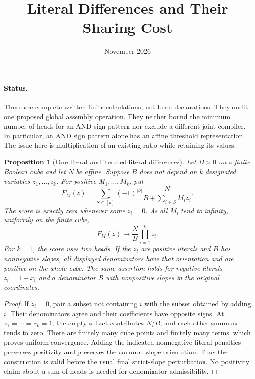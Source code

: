 \documentclass[11pt]{article}
\title{Literal Differences and Their Sharing Cost}
\author{}
\date{November 2026}
\newtheorem{proposition}{Proposition}
\begin{document}
\maketitle

\paragraph{Status.}
These are complete written finite calculations, not Lean declarations.
They audit one proposed global assembly operation. They neither bound
the minimum number of heads for an AND sign pattern nor exclude a
different joint compiler. In particular, an AND sign pattern alone has
an affine threshold representation. The issue here is multiplication
of an existing ratio while retaining its values.

\begin{proposition}[One literal and iterated literal differences]
Let $B>0$ on a finite Boolean cube and let $N$ be affine. Suppose $B$
does not depend on $k$ designated variables $z_1,\ldots,z_k$. For
positive $M_1,\ldots,M_k$, put
\[
 F_M(z)=\sum_{S\subseteq[k]}(-1)^{|S|}
       \frac{N}{B+\sum_{i\in S}M_i z_i}.
 \tag{1}
\]
The score is exactly zero whenever some $z_i=0$. As all $M_i$ tend to
infinity, uniformly on the finite cube,
\[
 F_M(z)\longrightarrow
 \frac{N}{B}\prod_{i=1}^k z_i.
 \tag{2}
\]
For $k=1$, the score uses two heads. If the $z_i$ are positive literals
and $B$ has nonnegative slopes, all displayed denominators have that
orientation and are positive on the whole cube. The same assertion
holds for negative literals $z_i=1-x_i$ and a denominator $B$ with
nonpositive slopes in the original coordinates.
\end{proposition}
\begin{proof}
If $z_i=0$, pair a subset not containing $i$ with the subset obtained
by adding $i$. Their denominators agree and their coefficients have
opposite signs. At $z_1=\cdots=z_k=1$, the empty subset contributes
$N/B$, and each other summand tends to zero. There are finitely many
cube points and finitely many terms, which proves uniform convergence.
Adding the indicated nonnegative literal penalties preserves positivity
and preserves the common slope orientation. Thus the construction is
valid before the usual final strict-slope perturbation. No positivity
claim about a sum of heads is needed for denominator admissibility.
\end{proof}
\end{document}
